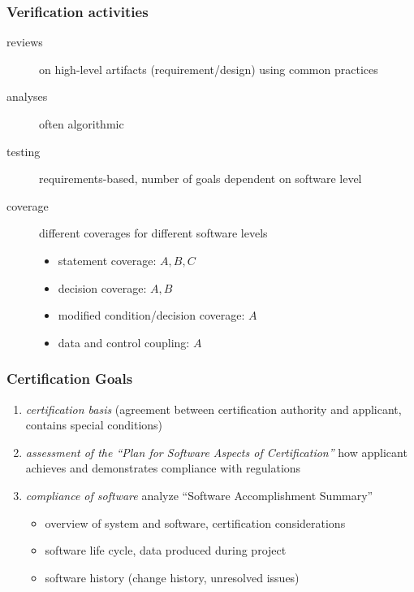 \documentclass[a4paper, 10pt]{article}
\begin{document}
\subsubsection*{Verification activities}
\begin{description}
    \item[reviews] on high-level artifacts (requirement/design) using common practices
    \item[analyses] often algorithmic
    \item[testing] requirements-based, number of goals dependent on software level
    \item[coverage] different coverages for different software levels
    \begin{itemize}
        \item statement coverage: $A,B,C$
        \item decision coverage: $A,B$
        \item modified condition/decision coverage: $A$
        \item data and control coupling: $A$
    \end{itemize}
\end{description}

\subsubsection*{Certification Goals}
\begin{enumerate}
    \item \emph{certification basis} (agreement between certification authority and applicant, contains special conditions)
    \item \emph{assessment of the ``Plan for Software Aspects of Certification''} how applicant achieves and demonstrates compliance with regulations
    \item \emph{compliance of software} analyze ``Software Accomplishment Summary''
    \begin{itemize}
        \item overview of system and software, certification considerations
        \item software life cycle, data produced during project
        \item software history (change history, unresolved issues)
    \end{itemize}
\end{enumerate}
\end{document}

